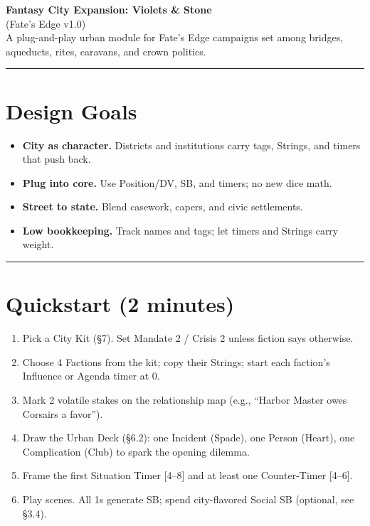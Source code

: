 \documentclass[11pt]{article}
\newcommand{\sectionrule}{\vspace{0.5em}\noindent\textcolor{gray}{\rule{\textwidth}{0.4pt}}\par\vspace{0.5em}}
\begin{document}


\begin{center}
    {\LARGE \textbf{Fantasy City Expansion: Violets \& Stone}} \\
    {\large (Fate's Edge v1.0)} \\
    \vspace{0.5em}
    A plug-and-play urban module for Fate's Edge campaigns set among bridges, aqueducts, rites, caravans, and crown politics.
\end{center}
\clearpage
\sectionrule

\section*{Design Goals}
\begin{itemize}
    \item \textbf{City as character.} Districts and institutions carry tags, Strings, and timers that push back.
    \item \textbf{Plug into core.} Use Position/DV, SB, and timers; no new dice math.
    \item \textbf{Street to state.} Blend casework, capers, and civic settlements.
    \item \textbf{Low bookkeeping.} Track names and tags; let timers and Strings carry weight.
\end{itemize}

\sectionrule

\section*{Quickstart (2 minutes)}
\begin{enumerate}
    \item Pick a City Kit (\S7). Set Mandate 2 / Crisis 2 unless fiction says otherwise.
    \item Choose 4 Factions from the kit; copy their Strings; start each faction's Influence or Agenda timer at 0.
    \item Mark 2 volatile stakes on the relationship map (e.g., ``Harbor Master owes Corsairs a favor'').
    \item Draw the Urban Deck (\S6.2): one Incident (Spade), one Person (Heart), one Complication (Club) to spark the opening dilemma.
    \item Frame the first Situation Timer [4--8] and at least one Counter-Timer [4--6].
    \item Play scenes. All 1s generate SB; spend city-flavored Social SB (optional, see \S3.4).
\end{enumerate}
\end{document}
